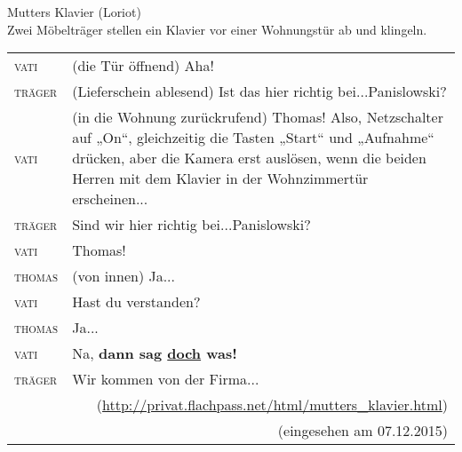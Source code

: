 \begin{exe}
	\ex\label{1083} 
	Mutters Klavier (Loriot)\\
	Zwei Möbelträger stellen ein Klavier vor einer Wohnungstür ab und klingeln.\\
	\begin{tabularx}{\linewidth}{@{}lX@{}}
	\textsc{vati} & (die Tür öffnend) Aha!\\
	\textsc{träger} & (Lieferschein ablesend) Ist das hier richtig bei...Panislowski?\\
	\textsc{vati} & (in die Wohnung zurückrufend) Thomas! Also, Netzschalter auf „On“, gleichzeitig die Tasten „Start“ und „Aufnahme“ 	drücken, aber die Kamera erst auslösen, wenn die beiden Herren mit dem Klavier in der Wohnzimmertür erscheinen...\\
	\textsc{träger} & Sind wir hier richtig bei...Panislowski?\\
	\textsc{vati} &  Thomas!\\
	\textsc{thomas} & (von innen) Ja...\\
	\textsc{vati} & Hast du verstanden?\\
	\textsc{thomas}&  Ja...\\
	\textsc{vati}  &Na, \textbf{dann sag \ul{doch} was!}\\
	\textsc{träger} & Wir kommen von der Firma...\\
    & \multicolumn{1}{r}{(\scriptsize\url{http://privat.flachpass.net/html/mutters\_klavier.html})}\\
    & \multicolumn{1}{r}{(eingesehen am 07.12.2015)}\\
    \end{tabularx}
\end{exe}
